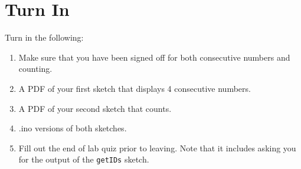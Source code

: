\section{Turn In}
Turn in the following:
\begin{enumerate}
    \item Make sure that you have been signed off for both consecutive numbers and counting.
    \item A PDF of your first sketch that displays 4 consecutive numbers.
    \item A PDF of your second sketch that counts.
    \item .ino versions of both sketches.
    \item Fill out the end of lab quiz prior to leaving. Note that it includes asking you 
            for the output of the \lstinline$getIDs$ sketch. 
\end{enumerate}